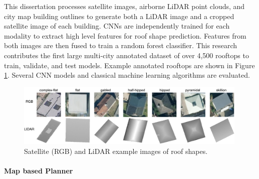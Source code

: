 This dissertation processes satellite images, airborne LiDAR point clouds, and city map  building outlines to generate both a LiDAR image and a cropped satellite image of each building. CNNs are independently trained for each modality to extract high level features for roof shape prediction. Features from both images are then fused to train a random forest classifier. This research contributes the first large multi-city annotated dataset of over 4,500 rooftops to train, validate, and test models.  Example annotated rooftops are shown in Figure \ref{fig:ch1_rooftop_shape_examples}. Several CNN models and classical machine learning algorithms are evaluated.

\begin{figure}[t]
\centering
\includegraphics[width=0.99\textwidth]{chapter_4_roofshape/imgs/RoofShapes.pdf}
\caption[Satellite and LiDAR depth images of common rooftops]{Satellite (RGB) and LiDAR example images of roof shapes.}
\label{fig:ch1_rooftop_shape_examples}
\end{figure}


\paragraph{Map based Planner}




